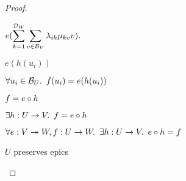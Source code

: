\begin{prop}
\begin{proof}
\begin{itemize}
\begin{itemize}
\begin{itemize}
              \step[=] $e(\displaystyle\sum\limits_{k=1}^{\mathcal{D}_{W}}\displaystyle\sum\limits_{v\in\mathcal{B}_{V}}\lambda_{ik}\mu_{kv}v).$

              \step[=] $e(h(u_i))$
            \end{itemize}
            \step[\imps]
              $\forall u_i\in\mathcal{B}_{U}\ldotp~f(u_i) = e(h(u_i))$
              \marginnote{$\forall$-\Intro}

            \step[\iffs]
              $f = e\circ h$
              \marginnote{\Def-$=$}

            \step[\imps]
              $\exists h : U \to V\ldotp~f = e\circ h$
              \marginnote{$\exists$-\Intro}
        \end{itemize}

        \step[\imps]
          $\forall e : V\twoheadrightarrow W, f : U \to W\ldotp~\exists h : U\to V\ldotp~e\circ h = f$
          \marginnote{$\forall$-\Intro}

        \step[\imps]
          $U$ preserves epics
          \qedhere
    \end{itemize}
  \end{proof}
\end{prop}
